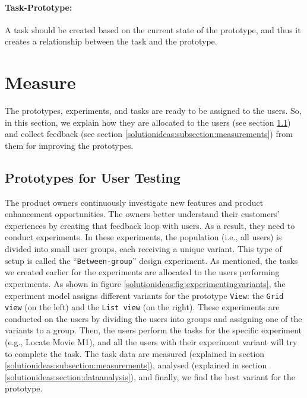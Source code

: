 \paragraph{Task-Prototype:} A task should be created based on the current state of the prototype, and thus it creates a relationship between the task and the prototype.


\section{Measure}
The prototypes, experiments, and tasks are ready to be assigned to the users. 
So, in this section, we explain how they are allocated to the users (see section \ref{solutionideas:subsection:usertesting}) and collect feedback (see section \ref{solutionideas:subsection:measurements}) from them for improving the prototypes.

\subsection{Prototypes for User Testing}
\label{solutionideas:subsection:usertesting}

The product owners continuously investigate new features and product enhancement opportunities. 
The owners better understand their customers' experiences by creating that feedback loop with users. 
As a result, they need to conduct experiments.
In these experiments, the population (i.e., all users) is divided into small user groups, each receiving a unique variant. 
This type of setup is called the ``\texttt{Between-group}'' design experiment. 
As mentioned, the tasks we created earlier for the experiments are allocated to the users performing experiments.
As shown in figure \ref{solutionideas:fig:experimentingvariants}, the experiment model assigns different variants for the prototype \texttt{View}: the \texttt{Grid view} (on the left) and the \texttt{List view} (on the right). 
These experiments are conducted on the users by dividing the users into groups and assigning one of the variants to a group. 
Then, the users perform the tasks for the specific experiment (e.g., Locate Movie M1), and all the users with their experiment variant will try to complete the task.
The task data are measured (explained in section \ref{solutionideas:subsection:measurements}), analysed (explained in section \ref{solutionideas:section:dataanalysis}), and finally, we find the best variant for the prototype.

